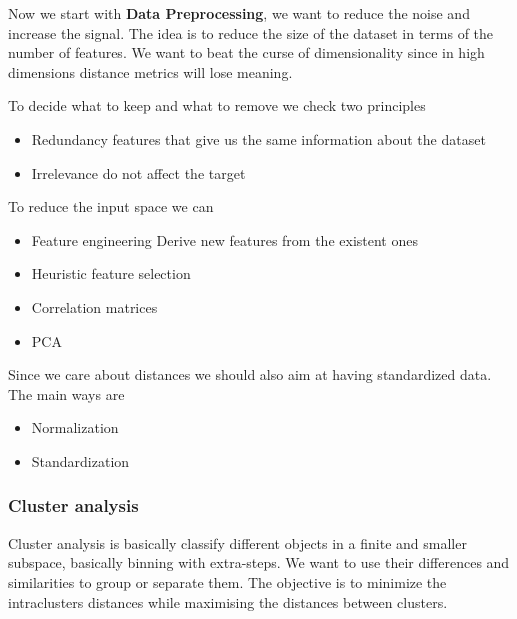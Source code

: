 \vspace{10pt}

Now we start with \textbf{Data Preprocessing}, we want to reduce the noise and increase the signal.
The idea is to reduce the size of the dataset in terms of the number of features. 
We want to beat the curse of dimensionality since in high dimensions distance metrics will lose meaning.

\vspace{10pt}

To decide what to keep and what to remove we check two principles

\begin{itemize}
    \item Redundancy \ra features that give us the same information about the dataset
    \item Irrelevance \ra do not affect the target
\end{itemize}

To reduce the input space we can
\begin{itemize}
    \item Feature engineering \ra Derive new features from the existent ones
    \item Heuristic feature selection
    \item Correlation matrices
    \item PCA
\end{itemize}

\vspace{10pt}

Since we care about distances we should also aim at having standardized data.
The main ways are

\begin{itemize}
    \item Normalization
    \item Standardization
\end{itemize}


\subsubsection{Cluster analysis}


Cluster analysis is basically classify different objects in a finite and smaller subspace, basically binning with extra-steps.
We want to use their differences and similarities to group or separate them.
The objective is to minimize the intraclusters distances while maximising the distances between clusters.

\vspace{10pt}

